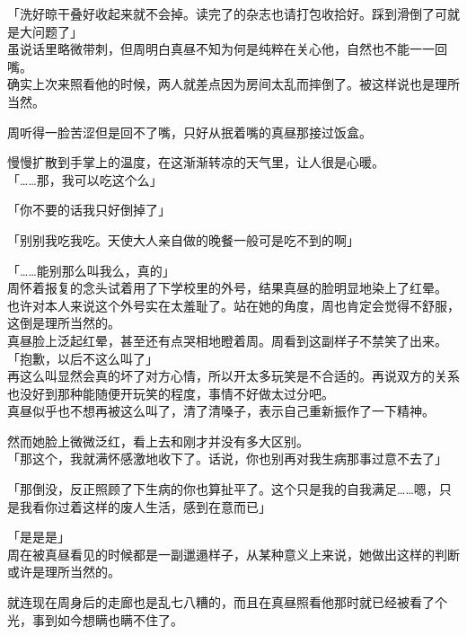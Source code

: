 「洗好晾干叠好收起来就不会掉。读完了的杂志也请打包收拾好。踩到滑倒了可就是大问题了」\\

虽说话里略微带刺，但周明白真昼不知为何是纯粹在关心他，自然也不能一一回嘴。\\

确实上次来照看他的时候，两人就差点因为房间太乱而摔倒了。被这样说也是理所当然。

周听得一脸苦涩但是回不了嘴，只好从抿着嘴的真昼那接过饭盒。

慢慢扩散到手掌上的温度，在这渐渐转凉的天气里，让人很是心暖。\\

「……那，我可以吃这个么」

「你不要的话我只好倒掉了」

「别别我吃我吃。天使大人亲自做的晚餐一般可是吃不到的啊」

「……能别那么叫我么，真的」\\

周怀着报复的念头试着用了下学校里的外号，结果真昼的脸明显地染上了红晕。\\

也许对本人来说这个外号实在太羞耻了。站在她的角度，周也肯定会觉得不舒服，这倒是理所当然的。\\

真昼脸上泛起红晕，甚至还有点哭相地瞪着周。周看到这副样子不禁笑了出来。\\

「抱歉，以后不这么叫了」\\

再这么叫显然会真的坏了对方心情，所以开太多玩笑是不合适的。再说双方的关系也没好到那种能随便开玩笑的程度，事情不好做太过分吧。\\

真昼似乎也不想再被这么叫了，清了清嗓子，表示自己重新振作了一下精神。

然而她脸上微微泛红，看上去和刚才并没有多大区别。\\

「那这个，我就满怀感激地收下了。话说，你也别再对我生病那事过意不去了」

「那倒没，反正照顾了下生病的你也算扯平了。这个只是我的自我满足……嗯，只是我看你过着这样的废人生活，感到在意而已」

「是是是」\\

周在被真昼看见的时候都是一副邋遢样子，从某种意义上来说，她做出这样的判断或许是理所当然的。

就连现在周身后的走廊也是乱七八糟的，而且在真昼照看他那时就已经被看了个光，事到如今想瞒也瞒不住了。\\

